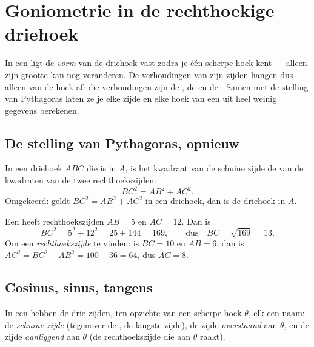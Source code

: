 \chapter{Goniometrie in de rechthoekige driehoek}\label{ch:g9:trig}

In een  ligt de \emph{vorm} van de driehoek vast zodra je één
scherpe hoek kent --- alleen zijn grootte kan nog veranderen. De verhoudingen van
zijn zijden hangen dus alleen van de hoek af: die verhoudingen zijn de , de
 en de . Samen met de stelling van Pythagoras laten ze je elke zijde en
elke hoek van een  uit heel weinig gegevens berekenen.

\section{De stelling van Pythagoras, opnieuw}

\begin{theorem}[Pythagoras]\label{thm:g9:trig:pythagoras}
In een driehoek $ABC$ die  is in $A$, is het kwadraat van de schuine
zijde de  van de kwadraten van de twee rechthoekszijden:
\[
BC^2 = AB^2 + AC^2 .
\]
Omgekeerd: geldt $BC^2 = AB^2 + AC^2$ in een driehoek, dan is de driehoek
 in $A$.
\end{theorem}
\admitted

\begin{example}\label{ex:g9:trig:pythagoras}
Een  heeft rechthoekszijden $AB = 5$ en $AC = 12$. Dan is
\[
BC^2 = 5^2 + 12^2 = 25 + 144 = 169,
\qquad\text{dus}\quad BC = \sqrt{169} = 13 .
\]
Om een \emph{rechthoekszijde} te vinden: is $BC = 10$ en $AB = 6$, dan is
$AC^2 = BC^2 - AB^2 = 100 - 36 = 64$, dus $AC = 8$.
\end{example}

\section{Cosinus, sinus, tangens}

In een  hebben de drie zijden, ten opzichte van een scherpe
hoek $\theta$, elk een naam: de \emph{schuine zijde} (tegenover de , de
langste zijde), de zijde \emph{overstaand} aan $\theta$, en de zijde
\emph{aanliggend} aan $\theta$ (de rechthoekszijde die aan $\theta$ raakt).

